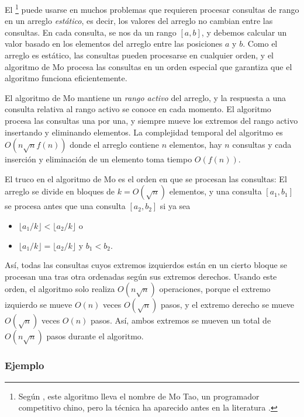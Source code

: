 
El \footnote{Según \cite{cod15}, este algoritmo
lleva el nombre de Mo Tao, un programador competitivo chino, pero
la técnica ha aparecido antes en la literatura \cite{ken06}.}
puede usarse en muchos problemas
que requieren procesar consultas de rango en
un arreglo \emph{estático}, es decir, los valores del arreglo
no cambian entre las consultas.
En cada consulta, se nos da un rango $[a,b]$,
y debemos calcular un valor basado en los
elementos del arreglo entre las posiciones $a$ y $b$.
Como el arreglo es estático,
las consultas pueden procesarse en cualquier orden,
y el algoritmo de Mo
procesa las consultas en un orden especial que garantiza
que el algoritmo funciona eficientemente.

El algoritmo de Mo mantiene un \emph{rango activo}
del arreglo, y la respuesta a una consulta
relativa al rango activo se conoce en cada momento.
El algoritmo procesa las consultas una por una,
y siempre mueve los extremos del
rango activo insertando y eliminando elementos.
La complejidad temporal del algoritmo es
$O(n \sqrt n f(n))$ donde el arreglo contiene
$n$ elementos, hay $n$ consultas
y cada inserción y eliminación de un elemento
toma tiempo $O(f(n))$.

El truco en el algoritmo de Mo es el orden
en que se procesan las consultas:
El arreglo se divide en bloques de $k=O(\sqrt n)$
elementos, y una consulta $[a_1,b_1]$
se procesa antes que una consulta $[a_2,b_2]$
si ya sea
\begin{itemize}
\item $\lfloor a_1/k \rfloor < \lfloor a_2/k \rfloor$ o
\item $\lfloor a_1/k \rfloor = \lfloor a_2/k \rfloor$ y $b_1 < b_2$.
\end{itemize}

Así, todas las consultas cuyos extremos izquierdos están
en un cierto bloque se procesan una tras otra
ordenadas según sus extremos derechos.
Usando este orden, el algoritmo
solo realiza $O(n \sqrt n)$ operaciones,
porque el extremo izquierdo se mueve
$O(n)$ veces $O(\sqrt n)$ pasos,
y el extremo derecho se mueve
$O(\sqrt n)$ veces $O(n)$ pasos. Así, ambos
extremos se mueven un total de $O(n \sqrt n)$ pasos durante el algoritmo.

\subsubsection*{Ejemplo}


